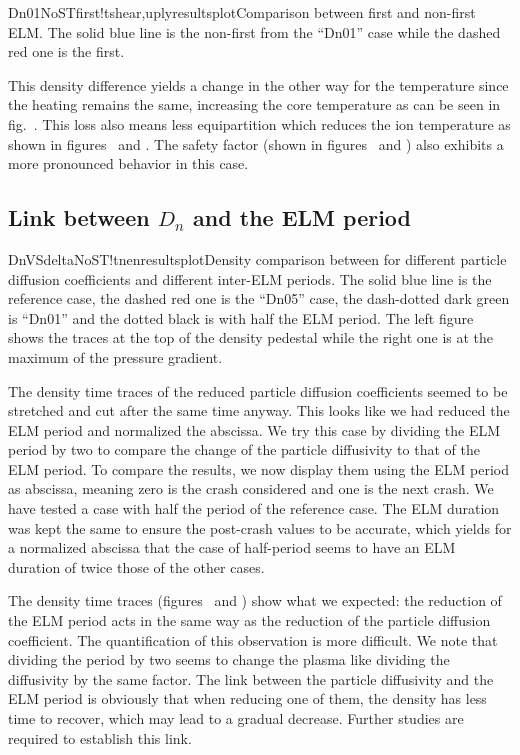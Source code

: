 \begin{AllFigs}{Dn01NoSTfirst}{!t}{}{shear,upl}{y}{resultsplot}{Comparison between first and non-first ELM. The solid blue line is the non-first from the ``Dn01'' case while the dashed red one is the first.}
\end{AllFigs}
This density difference yields a change in the other way for the temperature since the heating remains the same, increasing the core temperature as can be seen in fig.~. This loss also means less equipartition which reduces the ion temperature as shown in figures~ and . The safety factor (shown in figures~ and ) also exhibits a more pronounced behavior in this case.
\subsection{Link between $D_n$ and the ELM period}\label{sec:results:ELMs:recover:delta}
\begin{AllFigs}{DnVSdeltaNoST}{!t}{}{ne}{n}{resultsplot}{Density comparison between for different particle diffusion coefficients and different inter-ELM periods. The solid blue line is the reference case, the dashed red one is the ``Dn05'' case, the dash-dotted dark green is ``Dn01'' and the dotted black is with half the ELM period. The left figure shows the traces at the top of the density pedestal while the right one is at the maximum of the pressure gradient.}
\end{AllFigs}
The density time traces of the reduced particle diffusion coefficients seemed to be stretched and cut after the same time anyway. This looks like we had reduced the ELM period and normalized the abscissa. We try this case by dividing the ELM period by two to compare the change of the particle diffusivity to that of the ELM period. To compare the results, we now display them using the ELM period as abscissa, meaning zero is the crash considered and one is the next crash. We have tested a case with half the period of the reference case. The ELM duration was kept the same to ensure the post-crash values to be accurate, which yields for a normalized abscissa that the case of half-period seems to have an ELM duration of twice those of the other cases.

The density time traces (figures~ and ) show what we expected: the reduction of the ELM period acts in the same way as the reduction of the particle diffusion coefficient. The quantification of this observation is more difficult. We note that dividing the period by two seems to change the plasma like dividing the diffusivity by the same factor. The link between the particle diffusivity and the ELM period is obviously that when reducing one of them, the density has less time to recover, which may lead to a gradual decrease. Further studies are required to establish this link.

